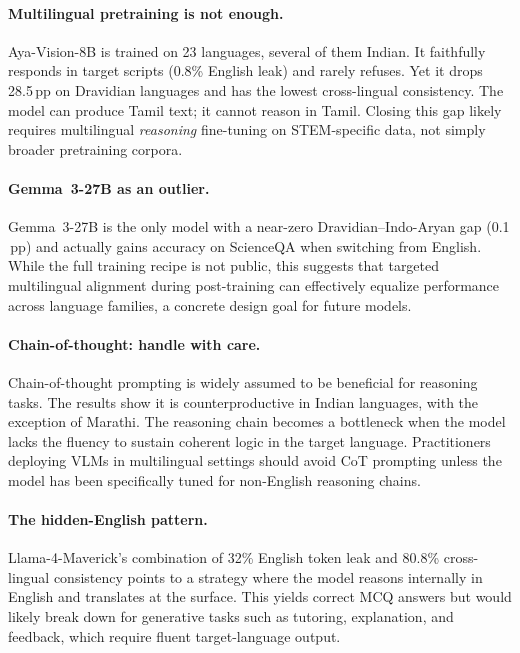 \documentclass[11pt,a4paper]{article}
\newcommand{\pp}{\,\text{pp}}
\begin{document}
\paragraph{Multilingual pretraining is not enough.}
Aya-Vision-8B is trained on 23 languages, several of them Indian.
It faithfully responds in target scripts (0.8\% English leak) and rarely refuses.
Yet it drops 28.5$\pp$ on Dravidian languages and has the lowest cross-lingual consistency.
The model can produce Tamil text; it cannot reason in Tamil.
Closing this gap likely requires multilingual \emph{reasoning} fine-tuning on STEM-specific data, not simply broader pretraining corpora.

\paragraph{Gemma~3-27B as an outlier.}
Gemma~3-27B is the only model with a near-zero Dravidian--Indo-Aryan gap (0.1$\pp$) and actually gains accuracy on ScienceQA when switching from English.
While the full training recipe is not public, this suggests that targeted multilingual alignment during post-training can effectively equalize performance across language families, a concrete design goal for future models.

\paragraph{Chain-of-thought: handle with care.}
Chain-of-thought prompting is widely assumed to be beneficial for reasoning tasks.
The results show it is counterproductive in Indian languages, with the exception of Marathi.
The reasoning chain becomes a bottleneck when the model lacks the fluency to sustain coherent logic in the target language.
Practitioners deploying VLMs in multilingual settings should avoid CoT prompting unless the model has been specifically tuned for non-English reasoning chains.

\paragraph{The hidden-English pattern.}
Llama-4-Maverick's combination of 32\% English token leak and 80.8\% cross-lingual consistency points to a strategy where the model reasons internally in English and translates at the surface.
This yields correct MCQ answers but would likely break down for generative tasks such as tutoring, explanation, and feedback, which require fluent target-language output.
\end{document}
